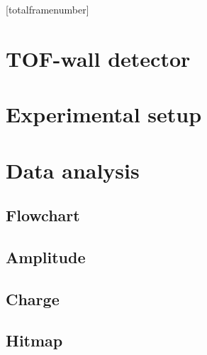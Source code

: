 \documentclass[9pt]{beamer}
\begin{document}
	[totalframenumber] 
	\frame{\titlepage}

	

	\section{TOF-wall detector}
		

	\section{Experimental setup}
		
		
		
		
	\section{Data analysis}
		\subsection{Flowchart}
			
		\subsection{Amplitude}
			
			
		\subsection{Charge}
			
			
		\subsection{Hitmap}
			

\end{document}

